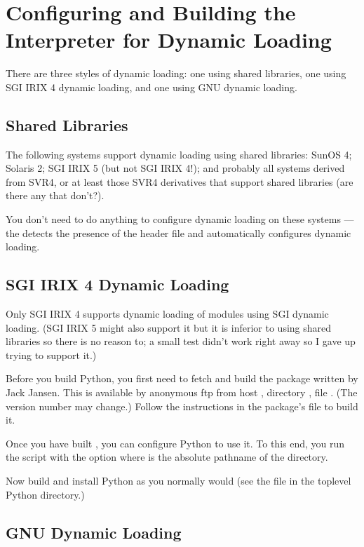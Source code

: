 \section{Configuring and Building the Interpreter for Dynamic Loading}

There are three styles of dynamic loading: one using shared libraries,
one using SGI IRIX 4 dynamic loading, and one using GNU dynamic
loading.

\subsection{Shared Libraries}

The following systems support dynamic loading using shared libraries:
SunOS 4; Solaris 2; SGI IRIX 5 (but not SGI IRIX 4!); and probably all
systems derived from SVR4, or at least those SVR4 derivatives that
support shared libraries (are there any that don't?).

You don't need to do anything to configure dynamic loading on these
systems --- the  detects the presence of the
 header file and automatically configures dynamic
loading.

\subsection{SGI IRIX 4 Dynamic Loading}

Only SGI IRIX 4 supports dynamic loading of modules using SGI dynamic
loading.  (SGI IRIX 5 might also support it but it is inferior to
using shared libraries so there is no reason to; a small test didn't
work right away so I gave up trying to support it.)

Before you build Python, you first need to fetch and build the 
package written by Jack Jansen.  This is available by anonymous ftp
from host , directory , file
.  (The version number may change.)  Follow the
instructions in the package's  file to build it.

Once you have built , you can configure Python to use it.  To
this end, you run the  script with the option
 where  is the absolute
pathname of the  directory.

Now build and install Python as you normally would (see the
 file in the toplevel Python directory.)

\subsection{GNU Dynamic Loading}

